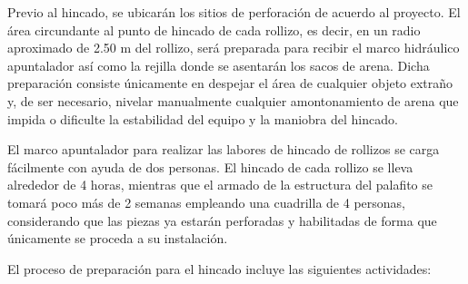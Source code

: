 \documentclass{article}
\begin{document}
\bigskip

Previo al hincado, se ubicarán los sitios de perforación de acuerdo al proyecto. El área circundante al punto de hincado de cada rollizo, es decir, en un radio aproximado de 2.50 m del rollizo, será preparada para recibir el marco hidráulico apuntalador así como la rejilla donde se asentarán los sacos de arena. Dicha preparación consiste únicamente en despejar el área de cualquier objeto extraño y, de ser necesario, nivelar manualmente cualquier amontonamiento de arena que impida o dificulte la estabilidad del equipo y la maniobra del hincado.


\bigskip

El marco apuntalador para realizar las labores de hincado de rollizos se carga fácilmente con ayuda de dos personas. El hincado de cada rollizo se lleva alrededor de 4 horas, mientras que el armado de la estructura del palafito se tomará poco más de 2 semanas empleando una cuadrilla de 4 personas, considerando que las piezas ya estarán perforadas y habilitadas de forma que únicamente se proceda a su instalación.


\bigskip

El proceso de preparación para el hincado incluye las siguientes actividades:


\bigskip
\end{document}
